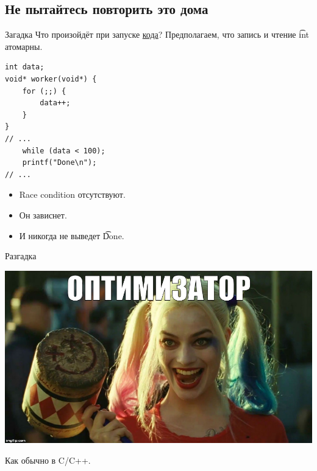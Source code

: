 \subsection{Не пытайтесь повторить это дома}

\begin{frame}
\end{frame}

\begin{frame}[fragile]{Загадка}
	Что произойдёт при запуске \href{https://raw.githubusercontent.com/yeputons/spring-2019-paradigms/master/190410/sources/12-optimizer.cpp}{кода}?
	Предполагаем, что запись и чтение \t{int} атомарны.
\begin{verbatim}
int data;
void* worker(void*) {
    for (;;) {
        data++;
    }
}
// ...
    while (data < 100);
    printf("Done\n");
// ...
\end{verbatim}
	\begin{itemize}
		\pause\item Race condition отсутствуют.
		\pause\item Он зависнет.
		\pause\item И никогда не выведет \t{Done}.
	\end{itemize}
\end{frame}

\begin{frame}{Разгадка}
	\begin{center}
		\includegraphics[scale=0.3]{optimizer.jpg}
	\end{center}
	Как обычно в C/C++.
\end{frame}

